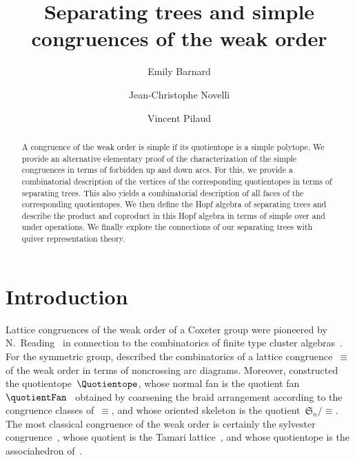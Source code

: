 \documentclass{amsart}
\title[Separating trees and simple comgruences]{Separating trees and simple congruences of the weak order}
\author{Emily Barnard}
\author{Jean-Christophe Novelli}
\author{Vincent Pilaud}
\theoremstyle{definition}
\newcommand{\f}[1]{{\mathfrak{#1}}} %
\begin{document}
\begin{abstract}
A congruence of the weak order is simple if its quotientope is a simple polytope.
We provide an alternative elementary proof of the characterization of the simple congruences in terms of forbidden up and down arcs.
For this, we provide a combinatorial description of the vertices of the corresponding quotientopes in terms of separating trees.
This also yields a combinatorial description of all faces of the corresponding quotientopes.
We then define the Hopf algebra of separating trees and describe the product and coproduct in this Hopf algebra in terms of simple over and under operations.
We finally explore the connections of our separating trees with quiver representation theory.
\end{abstract}

\maketitle

\tableofcontents

\pagebreak


\section{Introduction}
\label{sec:introduction}

Lattice congruences of the weak order of a Coxeter group were pioneered by N.~Reading~\cite{Reading-CambrianLattices} in connection to the combinatorics of finite type cluster algebras~\cite{FominZelevinsky-ClusterAlgebrasI,FominZelevinsky-ClusterAlgebrasII}.
For the symmetric group, \cite{Reading-arcDiagrams} described the combinatorics of a lattice congruence~$\equiv$ of the weak order in terms of noncrossing arc diagrams.
Moreover, \cite{PilaudSantos-quotientopes, PadrolPilaudRitter} constructed the quotientope~$\Quotientope$, whose normal fan is the quotient fan~$\quotientFan$~\cite{Reading-HopfAlgebras} obtained by coarsening the braid arrangement according to the congruence classes of~$\equiv$, and whose oriented skeleton is the quotient~$\f{S}_n/{\equiv}$.
The most classical congruence of the weak order is certainly the sylvester congruence~\cite{Tonks, HivertNovelliThibon-algebraBinarySearchTrees}, whose quotient is the Tamari lattice~\cite{Tamari}, and whose quotientope is the associahedron of~\cite{ShniderSternberg, Loday}.
\end{document}
